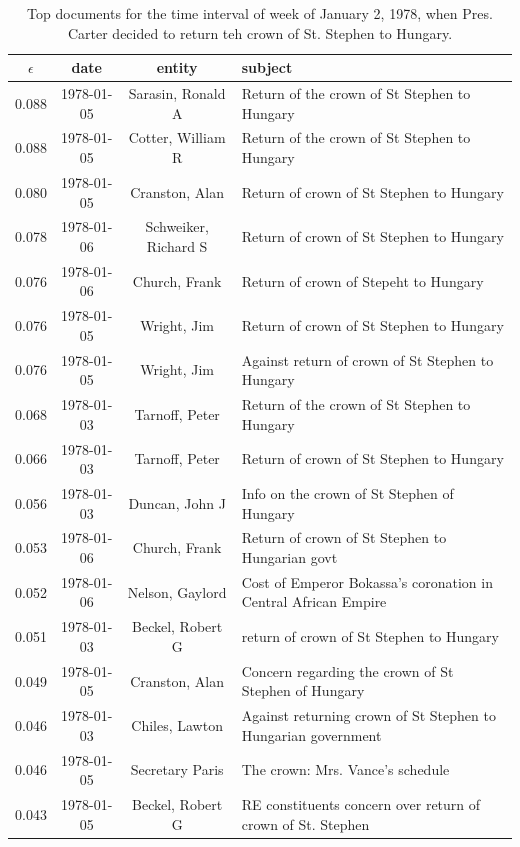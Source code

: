 \begin{table}[tb]
\small
\centering
\begin{tabular}{cccl}
\toprule
$\epsilon$ & date & entity & subject \\
\midrule
0.088 & 1978-01-05 & Sarasin, Ronald A & Return of the crown of St Stephen to Hungary \\
0.088 & 1978-01-05 & Cotter, William R & Return of the crown of St Stephen to Hungary \\
0.080 & 1978-01-05 & Cranston, Alan & Return of crown of St Stephen to Hungary \\
0.078 & 1978-01-06 & Schweiker, Richard S & Return of crown of St Stephen to Hungary \\
0.076 &  1978-01-06 & Church, Frank & Return of crown of Stepeht to Hungary \\
0.076 &  1978-01-05 & Wright, Jim & Return of crown of St Stephen to Hungary \\
0.076 &  1978-01-05 & Wright, Jim & Against return of crown of St Stephen to Hungary \\
0.068 &  1978-01-03 & Tarnoff, Peter & Return of the crown of St Stephen to Hungary \\
0.066 & 1978-01-03 & Tarnoff, Peter & Return of crown of St Stephen to Hungary \\
0.056 &  1978-01-03 & Duncan, John J & Info on the crown of St Stephen of Hungary \\
0.053 &  1978-01-06 & Church, Frank & Return of crown of St Stephen to Hungarian govt \\
0.052 &  1978-01-06 & Nelson, Gaylord & Cost of Emperor Bokassa's coronation in Central African Empire \\
0.051 &  1978-01-03 & Beckel, Robert G & return of crown of St Stephen to Hungary \\
0.049 &  1978-01-05 & Cranston, Alan & Concern regarding the crown of St Stephen of Hungary \\
0.046 &  1978-01-03 & Chiles, Lawton & Against returning crown of St Stephen to Hungarian government \\
0.046 &  1978-01-05 & Secretary Paris & The crown: Mrs. Vance's schedule \\
0.043 &  1978-01-05 & Beckel, Robert G & RE constituents concern over return of crown of St. Stephen \\
\bottomrule
\end{tabular}
\label{tab:crown}
\caption{Top documents for the time interval of week of January 2, 1978, when Pres. Carter decided to return teh crown of St. Stephen to Hungary.}
\end{table}

